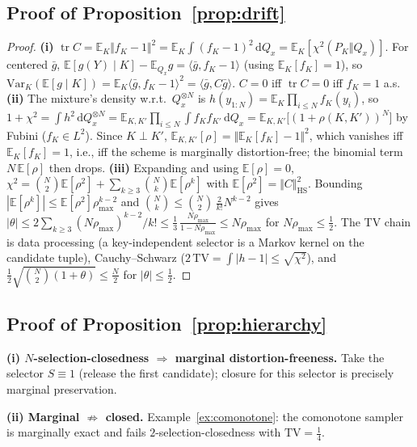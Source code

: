 \documentclass{article} %
\begin{document}
\subsection{Proof of Proposition~\ref{prop:drift}}
\begin{proof}
\textbf{(i)} $\operatorname{tr}C=\mathbb E_K\Vert f_K-1\Vert^2
=\mathbb E_K\int(f_K-1)^2\,\mathrm dQ_x=\mathbb E_K[\chi^2(P_K\Vert Q_x)]$.
For centered $\bar g$, $\mathbb E[g(Y)\mid K]-\mathbb E_{Q_x}g
=\langle\bar g,f_K-1\rangle$ (using $\mathbb E_K[f_K]=1$), so
$\mathrm{Var}_K(\mathbb E[g\mid K])
=\mathbb E_K\langle\bar g,f_K-1\rangle^2=\langle\bar g,C\bar g\rangle$.
$C=0$ iff $\operatorname{tr}C=0$ iff $f_K=1$ a.s.
\textbf{(ii)} The mixture's density w.r.t.\ $Q_x^{\otimes N}$ is
$h(y_{1:N})=\mathbb E_K\prod_{i\le N}f_K(y_i)$, so
$1+\chi^2=\int h^2\,\mathrm dQ_x^{\otimes N}
=\mathbb E_{K,K'}\prod_{i\le N}\int f_Kf_{K'}\,\mathrm dQ_x
=\mathbb E_{K,K'}\big[(1+\rho(K,K'))^N\big]$ by Fubini
($f_K\in L^2$). Since $K\perp K'$,
$\mathbb E_{K,K'}[\rho]=\Vert\mathbb E_K[f_K]-1\Vert^2$, which vanishes
iff $\mathbb E_K[f_K]=1$, i.e., iff the scheme is marginally
distortion-free; the binomial term $N\,\mathbb E[\rho]$ then drops.
\textbf{(iii)} Expanding and using $\mathbb E[\rho]=0$,
$\chi^2=\binom N2\mathbb E[\rho^2]+\sum_{k\ge3}\binom Nk\mathbb E[\rho^k]$
with $\mathbb E[\rho^2]=\Vert C\Vert_{\mathrm{HS}}^2$. Bounding
$|\mathbb E[\rho^k]|\le\mathbb E[\rho^2]\rho_{\max}^{k-2}$ and
$\binom Nk\le\binom N2\,\tfrac{2}{k!}N^{k-2}$ gives
$|\theta|\le2\sum_{k\ge3}(N\rho_{\max})^{k-2}/k!
\le\tfrac13\,\tfrac{N\rho_{\max}}{1-N\rho_{\max}}\le N\rho_{\max}$
for $N\rho_{\max}\le\tfrac12$. The TV chain is data processing (a
key-independent selector is a Markov kernel on the candidate tuple),
Cauchy--Schwarz ($2\,\mathrm{TV}=\int|h-1|\le\sqrt{\chi^2}$), and
$\tfrac12\sqrt{\binom N2(1+\theta)}\le\tfrac N2$ for
$|\theta|\le\tfrac12$.
\end{proof}

\subsection{Proof of Proposition~\ref{prop:hierarchy}}
\textbf{(i) $N$-selection-closedness $\Rightarrow$ marginal
distortion-freeness.} Take the selector $S\equiv 1$ (release the first
candidate); closure for this selector is precisely marginal preservation.

\textbf{(ii) Marginal $\not\Rightarrow$ closed.} Example~\ref{ex:comonotone}: the
comonotone sampler is marginally exact and fails $2$-selection-closedness with
$\mathrm{TV}=\tfrac14$.
\end{document}
